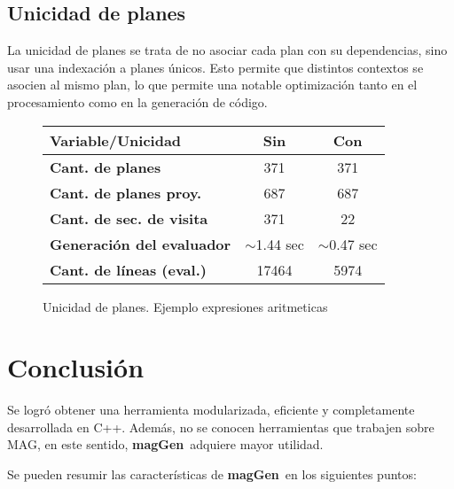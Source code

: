 \documentclass[runningheads,a4paper]{llncs}
\newcommand{\maggen}{\textbf{magGen}}
\begin{document}
\subsection{Unicidad de planes}
La unicidad de planes se trata de no asociar cada plan con su dependencias, sino usar una indexación a planes únicos. Esto permite que distintos contextos se asocien al mismo plan, lo que permite una notable optimización tanto en el procesamiento como en la generación de código.
        \begin{figure}[h]
        \begin{center}
        \setlength{\doublerulesep}{0mm}
        \setlength{\arrayrulewidth}{0.9pt}
        \begin{tabular}{|l||c|c|}
            \hline
            \rowcolor{gris} \textbf{Variable/Unicidad}&\textbf{Sin} & \textbf{Con} \\ \hline
            \rowcolor{white}\textbf{Cant. de planes}           & 371                        & 371                         \\ \hline
            \rowcolor{white}\textbf{Cant. de planes proy.}     & 687                        & 687                         \\ \hline
            \rowcolor{white}\textbf{Cant. de sec. de visita }  & \color{red}371             & \color{blue}22              \\ \hline
            \rowcolor{white}\textbf{Generación del evaluador}  & \color{red} $\sim$1.44 sec & \color{blue} $\sim$0.47 sec \\ \hline
            \rowcolor{white}\textbf{Cant. de líneas (eval.)}   & \color{red}17464           & \color{blue}5974            \\ \hline
        \end{tabular}
        \end{center}
\caption{Unicidad de planes. Ejemplo expresiones aritmeticas}
        \end{figure}

\section{Conclusión}

Se logró obtener una herramienta modularizada, eficiente y completamente desarrollada en C++. Además, no se conocen herramientas que trabajen sobre MAG, en este sentido, \maggen\ adquiere mayor utilidad. 

Se pueden resumir las características de \maggen\ en los siguientes puntos:
\end{document}
